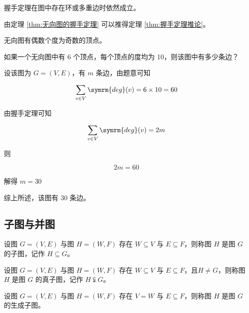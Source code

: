 握手定理在图中存在环或多重边时依然成立。

由定理 \ref{thm:无向图的握手定理} 可以推得定理 \ref{thm:握手定理推论}。
\begin{theorem}\label{thm:握手定理推论}
    无向图有偶数个度为奇数的顶点。
\end{theorem}

\begin{collections}
    \begin{example}
        如果一个无向图中有 6 个顶点，每个顶点的度均为 10，则该图中有多少条边？
    \end{example}
    \begin{solution}
        设该图为 $G=(V, E)$，有 $m$ 条边，由题意可知

        $$\sum_{v \in V}\symrm{deg}(v) = 6 \times 10 = 60$$

        由握手定理可知

        $$\sum_{v \in V}\symrm{deg}(v) = 2m$$

        则

        $$2m = 60$$

        解得 $m=30$

        综上所述，该图有 $30$ 条边。
    \end{solution}
\end{collections}

\subsection{子图与并图}
\begin{definition}[子图]\label{def:子图}
    设图 $G=(V, E)$ 与图 $H=(W, F)$ 存在 $W \subseteq V$ 与 $E \subseteq F$，则称图 $H$ 是图 $G$ 的子图，记作 $H \subseteq G$。
\end{definition}
\begin{definition}[真子图]\label{def:真子图}
    设图 $G=(V, E)$ 与图 $H=(W, F)$ 存在 $W \subseteq V$ 与 $E \subseteq F$，且$H \neq G$，则称图 $H$ 是图 $G$ 的真子图，记作 $H \subsetneqq G$。
\end{definition}
\begin{definition}[生成子图]\label{def:生成子图}
    设图 $G=(V, E)$ 与图 $H=(W, F)$ 存在 $V = W$ 与 $E \subseteq F$，则称图 $H$ 是图 $G$ 的生成子图。
\end{definition}

